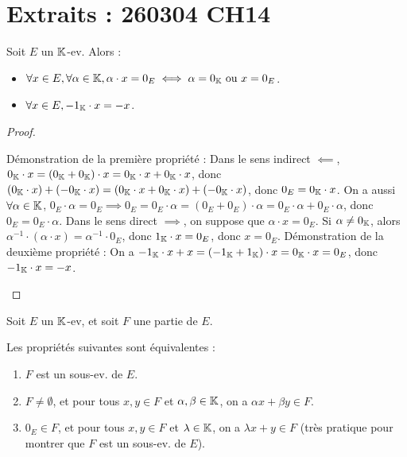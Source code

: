 \documentclass[12pt,a4paper]{report}
\begin{document}
\vspace{1em}


\section*{Extraits : 260304 CH14}


\begin{property}
    Soit $E$ un $\mathbb{K}$-ev. Alors :
    \begin{itemize}
        \item $\forall x \in E, \forall \alpha \in \mathbb{K}, \alpha \cdot x = 0_E \iff \alpha = 0_{\mathbb{K}} \text{ ou } x = 0_E$.
        \item $\forall x \in E, -1_{\mathbb{K}} \cdot x = -x$.
    \end{itemize}
\end{property}

\begin{proof}
    \begin{outline}
        \1 Démonstration de la première propriété :
            \2 Dans le sens indirect $\impliedby$, $0_{\mathbb{K}} \cdot x = (0_{\mathbb{K}} + 0_{\mathbb{K}}) \cdot x = 0_{\mathbb{K}} \cdot x + 0_{\mathbb{K}} \cdot x$, donc $(0_{\mathbb{K}} \cdot x) + (-0_{\mathbb{K}} \cdot x) = (0_{\mathbb{K}} \cdot x + 0_{\mathbb{K}} \cdot x) + (-0_{\mathbb{K}} \cdot x)$, donc $0_E = 0_{\mathbb{K}} \cdot x$.
            \2 On a aussi $\forall \alpha \in \mathbb{K}$, $0_E \cdot \alpha = 0_E \implies 0_E = 0_E \cdot \alpha = (0_E + 0_E) \cdot \alpha = 0_E \cdot \alpha + 0_E \cdot \alpha$, donc $0_E = 0_E \cdot \alpha$.
            \2 Dans le sens direct $\implies$, on suppose que $\alpha \cdot x = 0_E$. Si $\alpha \ne 0_{\mathbb{K}}$, alors $\alpha^{-1} \cdot (\alpha \cdot x) = \alpha^{-1} \cdot 0_E$, donc $1_{\mathbb{K}} \cdot x = 0_E$, donc $x = 0_E$.
        \1 Démonstration de la deuxième propriété :
            \2 On a $-1_{\mathbb{K}} \cdot x + x = (-1_{\mathbb{K}} + 1_{\mathbb{K}}) \cdot x = 0_{\mathbb{K}} \cdot x = 0_E$, donc $-1_{\mathbb{K}} \cdot x = -x$.
    \end{outline}
\end{proof}

\begin{property}
    Soit $E$ un $\mathbb{K}$-ev, et soit $F$ une partie de $E$.

    Les propriétés suivantes sont équivalentes :
    \begin{enumerate}
        \item $F$ est un sous-ev. de $E$.
        \item $F \neq \emptyset$, et pour tous $x,y\in F$ et $\alpha,\beta \in\mathbb{K}$, on a $\alpha x + \beta y \in F$.
        \item $0_E \in F$, et pour tous $x,y\in F$ et $\lambda \in\mathbb{K}$, on a $\lambda x + y \in F$ (très pratique pour montrer que $F$ est un sous-ev. de $E$).
    \end{enumerate}
\end{property}
\end{document}
